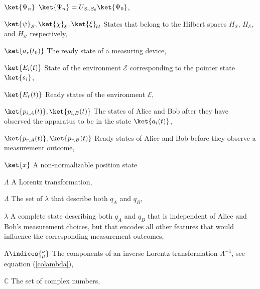 \begin{thenomenclature}
      \item [{$\ket{\Psi_n}$}]\begingroup $\ket{\Psi_n}=U_{S_nS_0}\ket{\Psi_0}$, \nomrefpage{}
      \item [{$\ket{\psi}_{\mathcal{S}}, \ket{\chi}_{\mathcal{E}}, \ket{\xi}_{\mathcal{U}}$}]\begingroup States that belong to the Hilbert spaces $H_{\mathcal{S}}$, $H_{\mathcal{E}}$, and $H_{\mathcal{U}}$ respectively,  \nomrefpage{}
      \item [{$\ket{a_r(t_0)}$}]\begingroup The ready state of a measuring device, \nomrefpage{}
      \item [{$\ket{E_i(t)}$}]\begingroup State of the environment $\mathcal{E}$ corresponding to the pointer state $\ket{s_i}$, \nomrefpage{}
      \item [{$\ket{E_r(t)}$}]\begingroup Ready states of the environment $\mathcal{E}$, \nomrefpage{}
      \item [{$\ket{p_{i, A}(t)}, \ket{p_{i, B}(t)}$}]\begingroup The states of Alice and Bob after they have observed the apparatus to be in the state $\ket{a_i(t)}$, \nomrefpage{}
      \item [{$\ket{p_{r, A}(t)}, \ket{p_{r, B}(t)}$}]\begingroup Ready states of Alice and Bob before they observe a measurement outcome, \nomrefpage{}
      \item [{$\ket{x}$}]\begingroup A non-normalizable position state \nomrefpage{}
      \item [{$\Lambda$}]\begingroup A Lorentz transformation, \nomrefpage{}
      \item [{$\Lambda$}]\begingroup The set of $\lambda$ that describe both $q_A$ and $q_B$, \nomrefpage{}
      \item [{$\lambda$}]\begingroup A complete state describing both $q_A$ and $q_B$ that is independent of Alice and Bob's measurement choices, but that encodes all other features that would influence the corresponding measurement outcomes, \nomrefpage{}
      \item [{$\Lambda\indices{_\mu^\nu}$}]\begingroup The components of an inverse Lorentz transformation $\Lambda^{-1}$, see equation (\ref{colambda}), \nomrefpage{}
      \item [{$\mathbb {C}$}]\begingroup The set of complex numbers, \nomrefpage {}

\end{thenomenclature}
